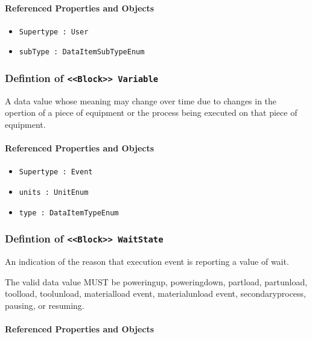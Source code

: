 \FloatBarrier
\paragraph{Referenced Properties and Objects}

\begin{itemize}
\item \texttt{Supertype : User}

\item \texttt{subType : DataItemSubTypeEnum}

\end{itemize}
\FloatBarrier
\subsubsection{Defintion of \texttt{<<Block>> Variable}}
  \label{type:Variable}

\FloatBarrier

A data value whose meaning may change over time due to changes in the opertion of a piece of equipment or the process being executed on that piece of equipment.

\FloatBarrier
\paragraph{Referenced Properties and Objects}

\begin{itemize}
\item \texttt{Supertype : Event}

\item \texttt{units : UnitEnum}

\item \texttt{type : DataItemTypeEnum}

\end{itemize}
\FloatBarrier
\subsubsection{Defintion of \texttt{<<Block>> WaitState}}
  \label{type:WaitState}

\FloatBarrier

An indication of the reason that execution event is reporting a value of wait.
  
 The valid data value MUST be poweringup, poweringdown, partload, partunload, toolload, toolunload, materialload event, materialunload event, secondaryprocess, pausing, or resuming.

\FloatBarrier
\paragraph{Referenced Properties and Objects}

